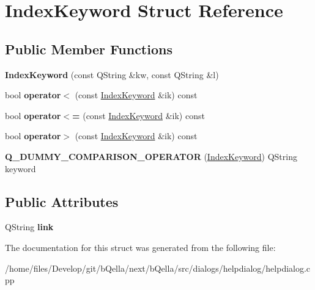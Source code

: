 \hypertarget{structIndexKeyword}{
\section{IndexKeyword Struct Reference}
\label{structIndexKeyword}
}
\subsection*{Public Member Functions}
\begin{DoxyCompactItemize}
\item 
\hypertarget{structIndexKeyword_a387b46eca30f097fc42fd7d640246200}{
{\bfseries IndexKeyword} (const QString \&kw, const QString \&l)}
\label{structIndexKeyword_a387b46eca30f097fc42fd7d640246200}

\item 
\hypertarget{structIndexKeyword_a7ae3c0d6f427be782db24eb413566e87}{
bool {\bfseries operator$<$} (const \hyperlink{structIndexKeyword}{IndexKeyword} \&ik) const }
\label{structIndexKeyword_a7ae3c0d6f427be782db24eb413566e87}

\item 
\hypertarget{structIndexKeyword_a317d3c5b2f8a7931fc3483f3368b7b7d}{
bool {\bfseries operator$<$=} (const \hyperlink{structIndexKeyword}{IndexKeyword} \&ik) const }
\label{structIndexKeyword_a317d3c5b2f8a7931fc3483f3368b7b7d}

\item 
\hypertarget{structIndexKeyword_a120b18bdedd7d1e6ac8a7ebd6af3c788}{
bool {\bfseries operator$>$} (const \hyperlink{structIndexKeyword}{IndexKeyword} \&ik) const }
\label{structIndexKeyword_a120b18bdedd7d1e6ac8a7ebd6af3c788}

\item 
\hypertarget{structIndexKeyword_a36899a6f58ffa1e1ff1b7bbf27ca8c95}{
{\bfseries Q\_\-DUMMY\_\-COMPARISON\_\-OPERATOR} (\hyperlink{structIndexKeyword}{IndexKeyword}) QString keyword}
\label{structIndexKeyword_a36899a6f58ffa1e1ff1b7bbf27ca8c95}

\end{DoxyCompactItemize}
\subsection*{Public Attributes}
\begin{DoxyCompactItemize}
\item 
\hypertarget{structIndexKeyword_a6ca211c5b074e106bd7b17bf9051d61c}{
QString {\bfseries link}}
\label{structIndexKeyword_a6ca211c5b074e106bd7b17bf9051d61c}

\end{DoxyCompactItemize}


The documentation for this struct was generated from the following file:\begin{DoxyCompactItemize}
\item 
/home/files/Develop/git/bQella/next/bQella/src/dialogs/helpdialog/helpdialog.cpp\end{DoxyCompactItemize}
